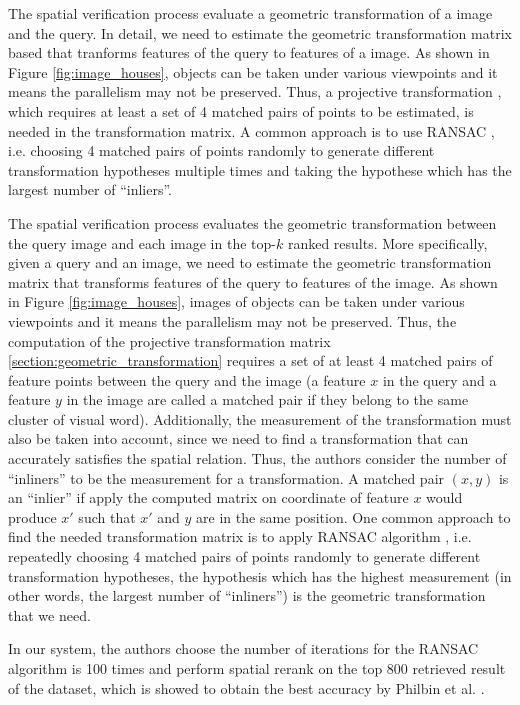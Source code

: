 The spatial verification process evaluate a geometric transformation of a image and the query. In detail, we need to estimate the geometric transformation matrix based that tranforms features of the query to features of a image. As shown in Figure \ref{fig:image_houses}, objects can be taken under various viewpoints and it means the parallelism may not be preserved. Thus, a projective transformation , which requires at least a set of 4 matched pairs of points to be estimated, is needed in the transformation matrix. A common approach is to use RANSAC \cite{Fischler1981}, i.e. choosing 4 matched pairs of points randomly to generate different transformation hypotheses multiple times and taking the hypothese which has the largest number of ``inliers''.

The spatial verification process evaluates the geometric transformation between the query image and each image in the top-$k$ ranked results. More specifically, given a query and an image, we need to estimate the geometric transformation matrix that transforms features of the query to features of the image. As shown in Figure \ref{fig:image_houses}, images of objects can be taken under various viewpoints and it means the parallelism may not be preserved. Thus, the computation of the projective transformation matrix \ref{section:geometric_transformation} requires a set of at least 4 matched pairs of feature points between the query and the image (a feature $x$ in the query and a feature $y$ in the image are called a matched pair if they belong to the same cluster of visual word). Additionally, the measurement of the transformation must also be taken into account, since we need to find a transformation that can accurately satisfies the spatial relation. Thus, the authors consider the number of \enquote{inliners} to be the measurement for a transformation. A matched pair $(x, y)$ is an \enquote{inlier} if apply the computed matrix on coordinate of feature $x$ would produce $x'$ such that $x'$ and $y$ are in the same position. One common approach to find the needed transformation matrix is to apply RANSAC algorithm \cite{Fischler1981}, i.e. repeatedly choosing 4 matched pairs of points randomly to generate different transformation hypotheses, the hypothesis which has the highest measurement (in other words, the largest number of \enquote{inliners}) is the geometric transformation that we need. 

In our system, the authors choose the number of iterations for the RANSAC algorithm is 100 times and perform spatial rerank on the top 800 retrieved result of the dataset, which is showed to obtain the best accuracy by Philbin et al. \cite{2}.
